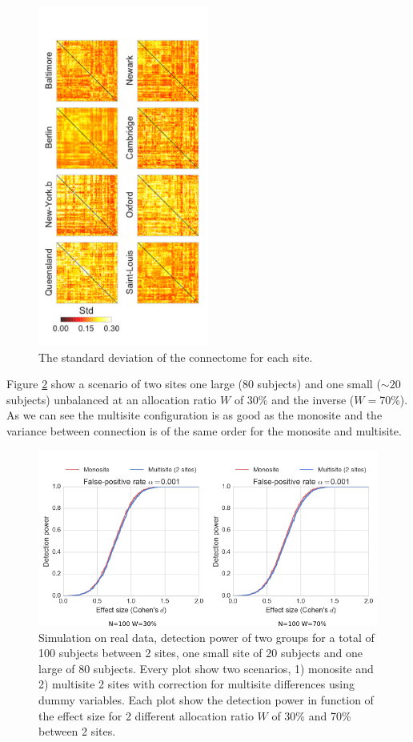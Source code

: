 \documentclass[authoryear]{elsarticle}
\begin{document}
\begin{figure}[tbp]
\centering
\includegraphics[width=0.50\textwidth]{../figures/connectome_std_multisite2.pdf}
\caption[]{
The standard deviation of the connectome for each site.
}
\label{fig_std_connectomes}
\end{figure}


Figure \ref{fig_real_sim_debalancing_2sites} show a scenario of two sites one large (80 subjects) and one small ($\sim20$ subjects) unbalanced at an allocation ratio $W$ of 30\% and the inverse ($W=$70\%). As we can see the multisite configuration is as good as the monosite and the variance between connection is of the same order for the monosite and multisite.

\begin{figure}[tbp]
\centering
\captionsetup[subfloat]{labelformat=empty}
\includegraphics[width=.75\textwidth]{../figures/simulations_real_2sites.png}
\caption{
Simulation on real data, detection power of two groups for a total of 100 subjects between 2 sites, one small site of 20 subjects and one large of 80 subjects. Every plot show two scenarios, 1) monosite and 2) multisite 2 sites with correction for multisite differences using dummy variables. Each plot show the detection power in function of the effect size for 2 different allocation ratio $W$ of 30\% and 70\% between 2 sites.
}
\label{fig_real_sim_debalancing_2sites}
\end{figure}
\end{document}
